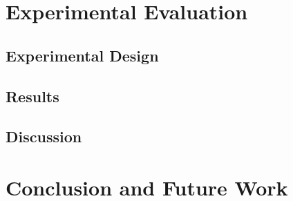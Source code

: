 \documentclass[letterpaper]{article}
\begin{document}
\section{Experimental Evaluation}
\subsection{Experimental Design}

\subsection{Results}

\subsection{Discussion}

\section{Conclusion and Future Work}
\end{document}

